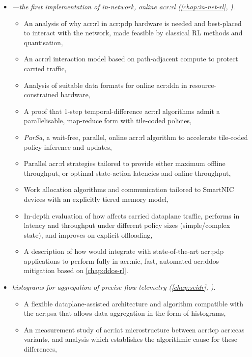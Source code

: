 \begin{itemize}
\begin{itemize}
	\end{itemize}
	\item \emph{\approachshort---the first implementation of in-network, online \gls{acr:rl} (\cref{chap:in-net-rl}, )}.
	\begin{itemize}
		\item An analysis of why \gls{acr:rl} in \gls{acr:pdp} hardware is needed and best-placed to interact with the network, made feasible by classical RL methods and quantisation,
		\item An \gls{acr:rl} interaction model based on path-adjacent compute to protect carried traffic,
		\item Analysis of suitable data formats for online \gls{acr:ddn} in resource-constrained hardware,
		\item A proof that 1-step temporal-difference \gls{acr:rl} algorithms admit a parallelisable, map-reduce form with tile-coded policies,
		\item \emph{ParSa}, a wait-free, parallel, online \gls{acr:rl} algorithm to accelerate tile-coded policy inference and updates,
		\item Parallel \gls{acr:rl} strategies tailored to provide either maximum offline throughput, or optimal state-action latencies and online throughput,
		\item Work allocation algorithms and communication tailored to SmartNIC devices with an explicitly tiered memory model,
		\item In-depth evaluation of how \approachshort{} affects carried dataplane traffic, performs in latency and throughput under different policy sizes (simple/complex state), and improves on explicit offloading,
		\item A description of how \approachshort{} would integrate with state-of-the-art \gls{acr:pdp} applications to perform fully in-\gls{acr:nic}, fast, automated \gls{acr:ddos} mitigation based on \cref{chap:ddos-rl}.
	\end{itemize}
	\item \emph{\seidr{} histograms for aggregation of precise flow telemetry (\cref{chap:seidr}, )}.
	\begin{itemize}
		\item A flexible dataplane-assisted architecture and algorithm compatible with the \gls{acr:psa} that allows data aggregation in the form of histograms,
		\item An measurement study of \gls{acr:iat} microstructure between \gls{acr:tcp} \glspl{acr:cca} variants, and analysis which establishes the algorithmic cause for these differences,

\end{itemize}
\end{itemize}
